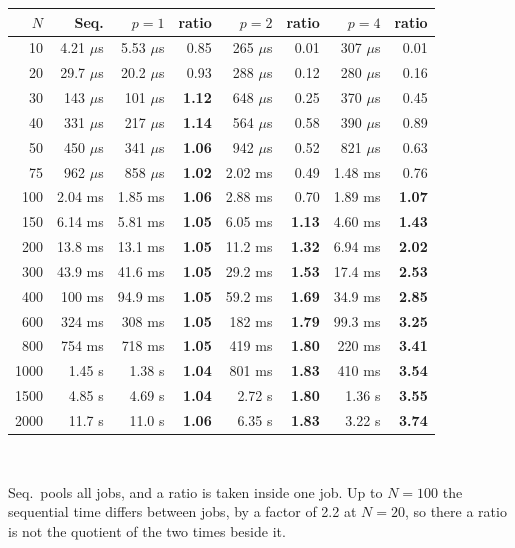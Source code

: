 \begin{tabular}{@{}r r r r r r r r@{}}
\toprule
$N$ & Seq. & $p=1$ & ratio & $p=2$ & ratio & $p=4$ & ratio \\
\midrule
10 & 4.21 $\mu$s & 5.53 $\mu$s & 0.85 & 265 $\mu$s & 0.01 & 307 $\mu$s & 0.01 \\
20 & 29.7 $\mu$s & 20.2 $\mu$s & 0.93 & 288 $\mu$s & 0.12 & 280 $\mu$s & 0.16 \\
30 & 143 $\mu$s & 101 $\mu$s & \textbf{1.12} & 648 $\mu$s & 0.25 & 370 $\mu$s & 0.45 \\
40 & 331 $\mu$s & 217 $\mu$s & \textbf{1.14} & 564 $\mu$s & 0.58 & 390 $\mu$s & 0.89 \\
50 & 450 $\mu$s & 341 $\mu$s & \textbf{1.06} & 942 $\mu$s & 0.52 & 821 $\mu$s & 0.63 \\
75 & 962 $\mu$s & 858 $\mu$s & \textbf{1.02} & 2.02 ms & 0.49 & 1.48 ms & 0.76 \\
100 & 2.04 ms & 1.85 ms & \textbf{1.06} & 2.88 ms & 0.70 & 1.89 ms & \textbf{1.07} \\
150 & 6.14 ms & 5.81 ms & \textbf{1.05} & 6.05 ms & \textbf{1.13} & 4.60 ms & \textbf{1.43} \\
200 & 13.8 ms & 13.1 ms & \textbf{1.05} & 11.2 ms & \textbf{1.32} & 6.94 ms & \textbf{2.02} \\
300 & 43.9 ms & 41.6 ms & \textbf{1.05} & 29.2 ms & \textbf{1.53} & 17.4 ms & \textbf{2.53} \\
400 & 100 ms & 94.9 ms & \textbf{1.05} & 59.2 ms & \textbf{1.69} & 34.9 ms & \textbf{2.85} \\
600 & 324 ms & 308 ms & \textbf{1.05} & 182 ms & \textbf{1.79} & 99.3 ms & \textbf{3.25} \\
800 & 754 ms & 718 ms & \textbf{1.05} & 419 ms & \textbf{1.80} & 220 ms & \textbf{3.41} \\
1000 & 1.45 s & 1.38 s & \textbf{1.04} & 801 ms & \textbf{1.83} & 410 ms & \textbf{3.54} \\
1500 & 4.85 s & 4.69 s & \textbf{1.04} & 2.72 s & \textbf{1.80} & 1.36 s & \textbf{3.55} \\
2000 & 11.7 s & 11.0 s & \textbf{1.06} & 6.35 s & \textbf{1.83} & 3.22 s & \textbf{3.74} \\
\bottomrule
\end{tabular}
\\[2pt] {\footnotesize \parbox{\columnwidth}{\raggedright Seq.\ pools all jobs, and a ratio is taken inside one job. Up to $N = 100$ the sequential time differs between jobs, by a factor of 2.2 at $N = 20$, so there a ratio is not the quotient of the two times beside it.}}
